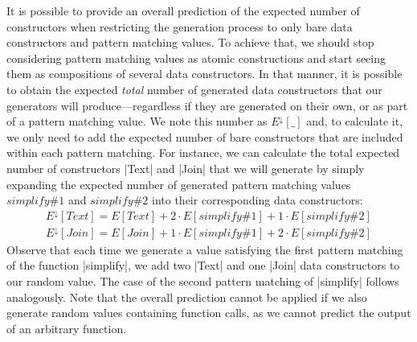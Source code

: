 It is possible to provide an overall prediction of the expected number of
constructors when restricting the generation process to only bare data
constructors and pattern matching values.
%
To achieve that, we should stop considering pattern matching values as atomic
constructions and start seeing them as compositions of several data
constructors.
%
In that manner, it is possible to obtain the expected \emph{total} number of
generated data constructors that our generators will produce---regardless if they
are generated on their own, or as part of a pattern matching value.
%
We note this number as $E^\downarrow\![\_]$ and, to calculate it, we only need
to add the expected number of bare constructors that are included within each
pattern matching.
%
For instance, we can calculate the total expected number of constructors |Text|
and |Join| that we will generate by simply expanding the expected number of
generated pattern matching values $simplify\#1$ and $simplify\#2$ into their
corresponding data constructors:
%
{\small
  \begin{align*}
    E^\downarrow\!\!\left[ Text \right]
    = E\left[ Text \right]
    + 2\! \cdot\!\! E\!\left[ simplify\#1 \right]
    + 1\!\! \cdot\!\! E\!\left[ simplify\#2 \right] \\
    E^\downarrow\!\!\left[ Join \right]
    = E\left[ Join \right]
    + 1\!\! \cdot\!\! E\!\left[ simplify\#1 \right]
    + 2\! \cdot\!\! E\!\left[ simplify\#2 \right]
  \end{align*}
}
%
Observe that each time we generate a value satisfying the first pattern matching
of the function |simplify|, we add two |Text| and one |Join| data constructors
to our random value.
%
The case of the second pattern matching of |simplify| follows analogously.
%
Note that the overall prediction cannot be applied if we also generate random
values containing function calls, as we cannot predict the output of an
arbitrary function.


